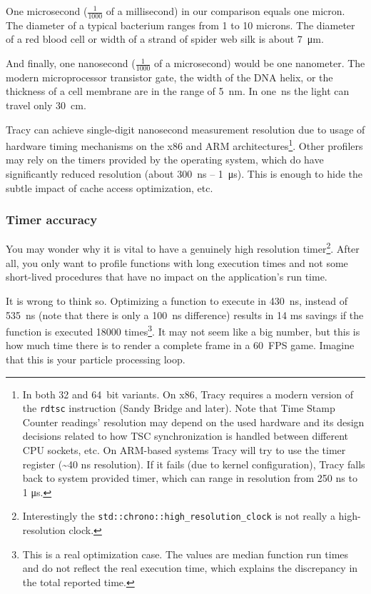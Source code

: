 \documentclass[hidelinks,titlepage,a4paper]{article}
\begin{document}
One microsecond ($\frac{1}{1000}$ of a millisecond) in our comparison equals one micron. The diameter of a typical bacterium ranges from 1 to 10 microns. The diameter of a red blood cell or width of a strand of spider web silk is about 7~\si{\micro\metre}.

And finally, one nanosecond ($\frac{1}{1000}$ of a microsecond) would be one nanometer. The modern microprocessor transistor gate, the width of the DNA helix, or the thickness of a cell membrane are in the range of 5~\si{\nano\metre}. In one~\si{\nano\second} the light can travel only 30~\si{\centi\meter}.

Tracy can achieve single-digit nanosecond measurement resolution due to usage of hardware timing mechanisms on the x86 and ARM architectures\footnote{In both 32 and 64~bit variants. On x86, Tracy requires a modern version of the \texttt{rdtsc} instruction (Sandy Bridge and later). Note that Time Stamp Counter readings' resolution may depend on the used hardware and its design decisions related to how TSC synchronization is handled between different CPU sockets, etc. On ARM-based systems Tracy will try to use the timer register (\textasciitilde 40 \si{\nano\second} resolution). If it fails (due to kernel configuration), Tracy falls back to system provided timer, which can range in resolution from 250 \si{\nano\second} to 1 \si{\micro\second}.}. Other profilers may rely on the timers provided by the operating system, which do have significantly reduced resolution (about 300~\si{\nano\second} -- 1~\si{\micro\second}). This is enough to hide the subtle impact of cache access optimization, etc.

\subsubsection{Timer accuracy}

You may wonder why it is vital to have a genuinely high resolution timer\footnote{Interestingly the \texttt{std::chrono::high\_resolution\_clock} is not really a high-resolution clock.}. After all, you only want to profile functions with long execution times and not some short-lived procedures that have no impact on the application's run time.

It is wrong to think so. Optimizing a function to execute in 430~\si{\nano\second}, instead of 535~\si{\nano\second} (note that there is only a 100~\si{\nano\second} difference) results in 14 \si{\milli\second} savings if the function is executed 18000 times\footnote{This is a real optimization case. The values are median function run times and do not reflect the real execution time, which explains the discrepancy in the total reported time.}. It may not seem like a big number, but this is how much time there is to render a complete frame in a 60~FPS game. Imagine that this is your particle processing loop.
\end{document}
